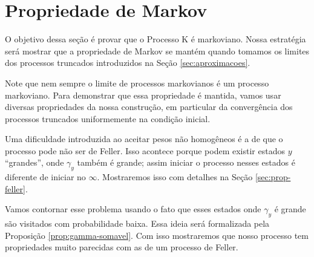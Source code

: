 
\section{Propriedade de Markov}
\label{sec:prop-markov}

O objetivo dessa seção é provar que o Processo K é markoviano. Nossa
estratégia será mostrar que a propriedade de Markov se mantém quando
tomamos os limites dos processos truncados introduzidos na Seção
\ref{sec:aproximacoes}.

Note que nem sempre o limite de processos markovianos é um processo
markoviano. Para demonstrar que essa propriedade é mantida, vamos usar
diversas propriedades da nossa construção, em particular da
convergência dos processos truncados uniformemente na condição
inicial.

Uma dificuldade introduzida ao aceitar pesos não homogêneos é a de que
o processo pode não ser de Feller. Isso acontece porque podem existir
estados $y$ ``grandes'', onde $\gamma_y$ também é grande; assim
iniciar o processo nesses estados é diferente de iniciar no
$\infty$. Mostraremos isso com detalhes na Seção
\ref{sec:prop-feller}.

Vamos contornar esse problema usando o fato que esses estados onde
$\gamma_y$ é grande são visitados com probabilidade baixa. Essa ideia
será formalizada pela Proposição \ref{prop:gamma-somavel}. Com isso
mostraremos que nosso processo tem propriedades muito parecidas com as
de um processo de Feller.

